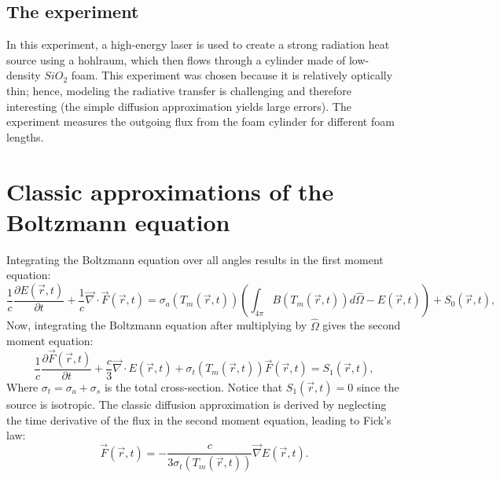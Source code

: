 \documentclass{article}
\begin{document}
\subsection*{The experiment}
In this experiment, a high-energy laser is used to create a strong radiation heat source using a hohlraum, which then flows through a cylinder made of low-density $SiO_2$ foam. This experiment was chosen because it is relatively optically thin; hence, modeling the radiative transfer is challenging and therefore interesting (the simple diffusion approximation yields large errors). The experiment measures the outgoing flux from the foam cylinder for different foam lengths.

\section{Classic approximations of the Boltzmann equation}
Integrating the Boltzmann equation over all angles results in the first moment equation:
\begin{equation}
\frac{1}{c}\frac{\partial E(\vec{r}, t)}{\partial t} + \frac{1}{c} \vec{\nabla} \cdot \vec{F}(\vec{r}, t) = \sigma_a(T_m(\vec{r}, t)) \left( \int_{4\pi} B(T_m(\vec{r}, t)) d\hat{\Omega} - E(\vec{r}, t) \right) + S_0(\vec{r}, t),
\end{equation}
Now, integrating the Boltzmann equation after multiplying by \(\hat{\Omega}\) gives the second moment equation:
\begin{equation}
\frac{1}{c}\frac{\partial \vec{F}(\vec{r}, t)}{\partial t} + \frac{c}{3} \vec{\nabla} \cdot {E}(\vec{r}, t) + \sigma_t(T_m(\vec{r}, t)) \vec{F}(\vec{r}, t) = S_1(\vec{r}, t),
\end{equation}
Where $\sigma_t = \sigma_a + \sigma_s$ is the total cross-section. Notice that $S_1(\vec{r},t)=0$ since the source is isotropic. The classic diffusion approximation is derived by neglecting the time derivative of the flux in the second moment equation, leading to Fick's law:
\begin{equation}
\vec{F}(\vec{r}, t) = -\frac{c}{3\sigma_t(T_m(\vec{r}, t))} \vec{\nabla} E(\vec{r}, t).
\end{equation}
\end{document}
